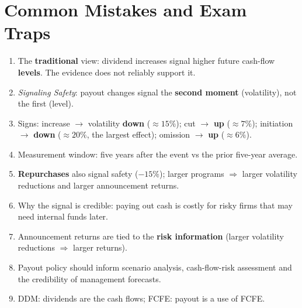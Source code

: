 \section{Common Mistakes and Exam Traps}
\begin{trapbox}
\begin{enumerate}[leftmargin=*]
  \item The \textbf{traditional} view: dividend increases signal higher future cash-flow \textbf{levels}. The evidence does not reliably support it.
  \item \emph{Signaling Safety}: payout changes signal the \textbf{second moment} (volatility), not the first (level).
  \item Signs: increase $\to$ volatility \textbf{down} ($\approx15\%$); cut $\to$ \textbf{up} ($\approx7\%$); initiation $\to$ \textbf{down} ($\approx20\%$, the largest effect); omission $\to$ \textbf{up} ($\approx6\%$).
  \item Measurement window: five years after the event vs the prior five-year average.
  \item \textbf{Repurchases} also signal safety ($-15\%$); larger programs $\Rightarrow$ larger volatility reductions and larger announcement returns.
  \item Why the signal is credible: paying out cash is costly for risky firms that may need internal funds later.
  \item Announcement returns are tied to the \textbf{risk information} (larger volatility reductions $\Rightarrow$ larger returns).
  \item Payout policy should inform scenario analysis, cash-flow-risk assessment and the credibility of management forecasts.
  \item DDM: dividends are the cash flows; FCFE: payout is a use of FCFE.
\end{enumerate}
\end{trapbox}
